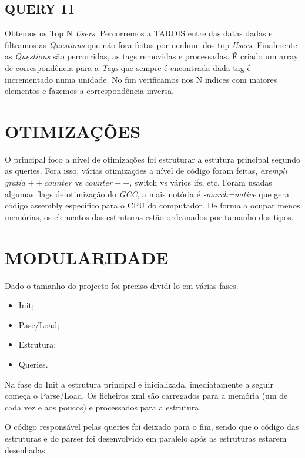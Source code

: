 \documentclass[letterpaper, 10 pt, conference]{IEEEtran}  %
\begin{document}
\subsection{QUERY 11}

Obtemos os Top N \textit{Users}.
Percorremos a TARDIS entre das datas dadas e filtramos as \textit{Questions} que não fora feitas por nenhum dos top \textit{Users}. Finalmente as \textit{Questions} são percorridas, as tags removidas e processadas.
É criado um array de correspondência para a \textit{Tags} que sempre é encontrada dada tag é incrementado numa unidade. No fim verificamos nos N indices com maiores elementos e fazemos a correspondência inversa.


\section{OTIMIZAÇÕES}

O principal foco a nível de otimizações foi estruturar a estutura principal segundo as queries. Fora isso, várias otimizações a nível de código foram feitas, \textit{exempli gratia} $++counter$ vs $counter++$, switch vs vários ifs, etc.
Foram usadas algumas flags de otimização do \textit{GCC}, a mais notória é \textit{-march=native} que gera código assembly específico para o CPU do computador.
De forma a ocupar menos memórias, os elementos das estruturas estão ordeanados por tamanho dos tipos.

\section{MODULARIDADE}

Dado o tamanho do projecto foi preciso dividi-lo em várias fases.

\begin{itemize}
\item Init;
\item Pase/Load;
\item Estrutura;
\item Queries.
\end{itemize}

Na fase do Init a estrutura principal é inicializada, imediatamente a seguir começa o Parse/Load. Os ficheiros xml são carregados para a memória (um de cada vez e aos poucos) e processados para a estrutura.

O código responsável pelas queries foi deixado para o fim, sendo que o código das estruturas e do parser foi desenvolvido em paralelo após as estruturas estarem desenhadas.
\end{document}
